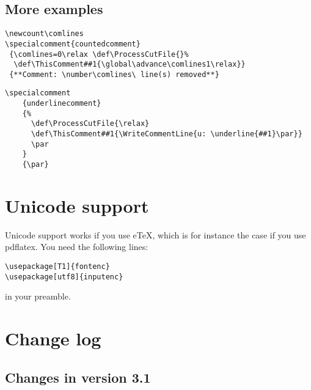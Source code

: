 \documentclass[parskip=false, DIV=8, headings=normal, pagesize=auto]{artikel3}%
\makeatletter
\newcommand*{\cs}[1]{\texttt{\textbackslash#1}}
\newcommand*{\cmd}[1]{\cs{\expandafter\@gobble\string#1}}
\newcommand*{\meta}[1]{\textlangle\textsl{#1}\textrangle}
\newcommand*{\marg}[1]{\texttt{\{}\meta{#1}\texttt{\}}}
\makeatother
\begin{document}
\subsection{More examples}

\begin{verbatim}
\newcount\comlines
\specialcomment{countedcomment}
 {\comlines=0\relax \def\ProcessCutFile{}%
  \def\ThisComment##1{\global\advance\comlines1\relax}}
 {**Comment: \number\comlines\ line(s) removed**}
\end{verbatim}

\begin{verbatim}
\specialcomment
    {underlinecomment}
    {%
      \def\ProcessCutFile{\relax}
      \def\ThisComment##1{\WriteCommentLine{u: \underline{##1}\par}}
      \par
    }
    {\par}
\end{verbatim}

\section{Unicode support}

Unicode support works if you use e\TeX, which is for instance the case
if you use pdflatex. You need the following lines:
\begin{verbatim}
\usepackage[T1]{fontenc}
\usepackage[utf8]{inputenc}
\end{verbatim}
in your preamble.

\section{Change log}

\subsection{Changes in version 3.1}

\end{document}
